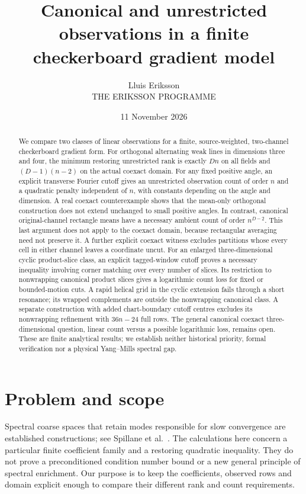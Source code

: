 \documentclass[11pt,a4paper]{article}
\title{Canonical and unrestricted observations in a finite checkerboard gradient model}
\author{Lluis Eriksson\\\small THE ERIKSSON PROGRAMME}
\date{11 November 2026}
\begin{document}
\maketitle
\begin{abstract}
We compare two classes of linear observations for a finite, source-weighted,
two-channel checkerboard gradient form. For orthogonal alternating weak lines
in dimensions three and four, the minimum restoring unrestricted rank is
exactly $Dn$ on all fields and $(D-1)(n-2)$ on the actual coexact domain.
For any fixed positive angle, an explicit transverse Fourier cutoff gives
an unrestricted observation count of order $n$ and a quadratic penalty
independent of $n$, with constants depending on the angle and dimension.
A real coexact counterexample shows that the mean-only orthogonal construction
does not extend unchanged to small positive angles. In contrast, canonical
original-channel rectangle means have a necessary ambient count of order
$n^{D-2}$. This last argument does not apply to the coexact domain, because
rectangular averaging need not preserve it. A further explicit coexact witness
excludes partitions whose every cell in either channel leaves a coordinate
uncut. For an enlarged three-dimensional cyclic product-slice class, an explicit
tagged-window cutoff proves a necessary inequality involving corner
matching over every number of slices. Its restriction to nonwrapping
canonical product slices gives a logarithmic count loss for fixed or
bounded-motion cuts. A rapid helical grid in the cyclic extension fails
through a short resonance; its wrapped complements are outside the
nonwrapping canonical class. A separate construction with added chart-boundary
cutoff centres excludes its nonwrapping refinement with $36n-24$ full rows.
The general canonical coexact three-dimensional question, linear count
versus a possible logarithmic loss, remains open. These are finite analytical results;
we establish neither historical priority, formal verification nor a physical
Yang--Mills spectral gap.
\end{abstract}

\section{Problem and scope}
Spectral coarse spaces that retain modes responsible for slow convergence are
established constructions; see Spillane et al.~\cite{spillane2011,spillane2014}.
The calculations here concern a particular finite coefficient family and a
restoring quadratic inequality. They do not prove a preconditioned condition
number bound or a new general principle of spectral enrichment. Our purpose is
to keep the coefficients, observed rows and domain explicit enough to compare
their different rank and count requirements.
\end{document}
